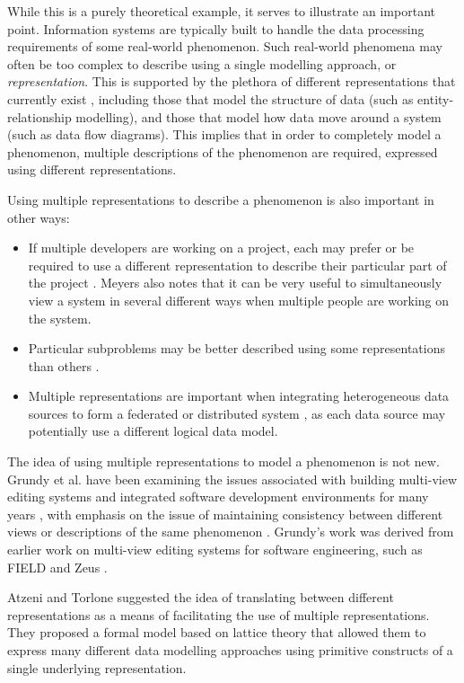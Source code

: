 \documentclass[11pt,oribibl]{llncs}
\begin{document}
While this is a purely theoretical example, it serves to illustrate an important point. Information systems are typically built to handle the data processing requirements of some real-world phenomenon. Such real-world phenomena may often be too complex to describe using a single modelling approach, or \emph{representation}. This is supported by the plethora of different representations that currently exist \cite{Hull:R:1987,Tsic:D:1982}, including those that model the structure of data (such as entity-relationship modelling), and those that model how data move around a system (such as data flow diagrams). This implies that in order to completely model a phenomenon, multiple descriptions of the phenomenon are required, expressed using different representations.

Using multiple representations to describe a phenomenon is also important in other ways:
\begin{itemize}
	\item If multiple developers are working on a project, each may prefer or be required to use a different representation to describe their particular part of the project \cite{Atze:P:1996:EDBT}. Meyers \cite{Meye:S:1991:IEEE} also notes that it can be very useful to simultaneously view a system in several different ways when multiple people are working on the system.
	\item Particular subproblems may be better described using some representations than others \cite{East:SM:1991:PhD}.
	\item Multiple representations are important when integrating heterogeneous data sources to form a federated or distributed system \cite{Atze:P:1996:EDBT}, as each data source may potentially use a different logical data model.
\end{itemize}

The idea of using multiple representations to model a phenomenon is not new. Grundy et al. have been examining the issues associated with building multi-view editing systems and integrated software development environments for many years \cite{Grun:JC:1993:PhD,Grun:JC:1997:IJAST,Grun:JC:1995:CAiSE}, with emphasis on the issue of maintaining consistency between different views or descriptions of the same phenomenon \cite{Grun:JC:1996:SPE,Hosk:JG:1995:NZCS}. Grundy's work was derived from earlier work on multi-view editing systems for software engineering, such as FIELD \cite{Reis:SP:1990:IEEE} and Zeus \cite{Brow:MH:1992:Zeus}.

Atzeni and Torlone \cite{Atze:P:1997:MDM} suggested the idea of translating between different representations as a means of facilitating the use of multiple representations. They proposed a formal model based on lattice theory \cite{Atze:P:1995:Lattice} that allowed them to express many different data modelling approaches using primitive constructs of a single underlying representation.
\end{document}
